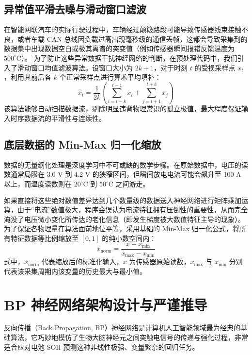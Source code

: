 \documentclass[10pt, a4paper, twocolumn]{ctexart}
\begin{document}
\subsection{异常值平滑去噪与滑动窗口滤波}
在智能网联汽车的实际行驶过程中，车辆经过颠簸路段可能导致传感器线束接触不良，或者车载 CAN 总线因负载过高出现毫秒级的通信丢帧，这都会导致采集到的数据集中出现数据空白或极其离谱的突变值（例如传感器瞬间报错反馈温度为 $500^\circ\text{C}$）。
为了防止这些异常数据干扰神经网络的判断，在预处理代码中，我们引入了滑动窗口均值滤波算法。设窗口大小为 $2k+1$，对于时刻 $t$ 的受损采样点 $x_t$，利用其前后各 $k$ 个正常采样点进行算术平均填补：
\begin{equation}
    \hat{x}_t = \frac{1}{2k} \left( \sum_{i=t-k}^{t-1} x_i + \sum_{j=t+1}^{t+k} x_j \right) 
\end{equation}
该算法能够自动扫描数据流，剔除明显违背物理常识的孤立极值，最大程度保证输入时序数据流的平滑性与连续性。

\subsection{底层数据的 Min-Max 归一化缩放}
数据的无量纲化处理是深度学习中不可或缺的数学步骤。在原始数据中，电压的读数通常局限在 3.0 V 到 4.2 V 的狭窄区间，但瞬间放电电流可能会飙升至 100 A 以上，而温度读数则在 $20^\circ\text{C}$ 到 $50^\circ\text{C}$ 之间游走。

如果直接将这些绝对数值差异达到几个数量级的数据送入神经网络进行矩阵乘加运算，由于“电流”数值极大，程序会误认为电流特征拥有压倒性的重要性，从而完全淹没了电压微小变化所传达的老化信息（即发生梯度被大数值特征主导的现象）。
为了保证各物理量在算法面前地位平等，采用基础的 Min-Max 归一化公式，将所有特征数据等比例缩放至 $[0, 1]$ 的纯小数空间内：
\begin{equation}
    x_{\text{norm}} = \frac{x - x_{\text{min}}}{x_{\text{max}} - x_{\text{min}}} 
\end{equation}
式中，$x_{\text{norm}}$ 代表缩放后的标准化输入，$x$ 为传感器原始读数，$x_{\text{max}}$ 与 $x_{\text{min}}$ 分别代表该采集周期内该变量的历史最大与最小值。

\section{BP 神经网络架构设计与严谨推导}
反向传播（Back Propagation, BP）神经网络是计算机人工智能领域最为经典的基础算法，它巧妙地模仿了生物大脑神经元之间突触电信号的传递与强化过程，非常适合应对电池 SOH 预测这种非线性极强、变量繁杂的回归任务。
\end{document}
